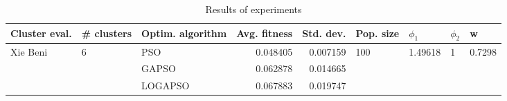 \begin{table}
\centering
\caption{Results of experiments}
\begin{tabular}{lllrrllll}
\toprule
            Cluster eval. &        \# clusters & Optim. algorithm &  Avg. fitness &  Std. dev. &            Pop. size &               $\phi_{1}$ &         $\phi_{2}$ &                       w \\
\midrule
\multirow{3}{*}{Xie Beni} & \multirow{3}{*}{6} &              PSO &      0.048405 &   0.007159 & \multirow{3}{*}{100} & \multirow{3}{*}{1.49618} & \multirow{3}{*}{1} & \multirow{3}{*}{0.7298} \\
                          &                    &            GAPSO &      0.062878 &   0.014665 &                      &                          &                    &                         \\
                          &                    &          LOGAPSO &      0.067883 &   0.019747 &                      &                          &                    &                         \\
\bottomrule
\end{tabular}
\end{table}
